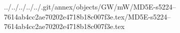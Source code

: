 ../../../../../.git/annex/objects/GW/mW/MD5E-s5224--7614ab4cc2ae70202e4718b18c007f3e.tex/MD5E-s5224--7614ab4cc2ae70202e4718b18c007f3e.tex